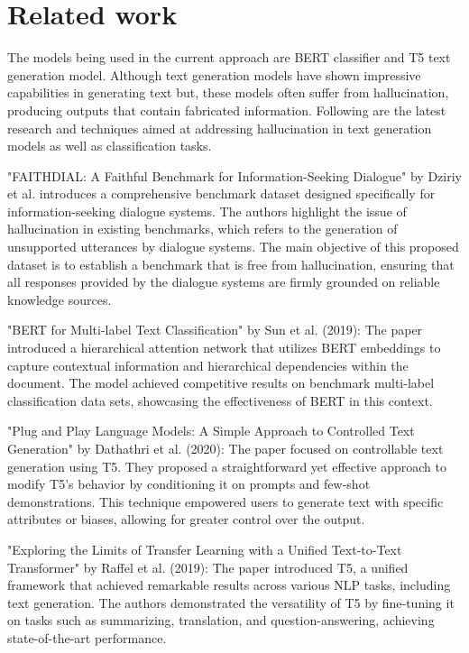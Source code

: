\documentclass[11pt]{article}
\begin{document}
\section{Related work}
The models being used in the current approach are BERT classifier and T5 text generation model. Although text generation models have shown impressive capabilities in generating text but, these models often suffer from hallucination, producing outputs that contain fabricated information. Following are the latest research and techniques aimed at addressing hallucination in text generation models as well as classification tasks. \par
"FAITHDIAL: A Faithful Benchmark for Information-Seeking Dialogue" by Dziriy et al. introduces a comprehensive benchmark dataset designed specifically for information-seeking dialogue systems. The authors highlight the issue of hallucination in existing benchmarks, which refers to the generation of unsupported utterances by dialogue systems. The main objective of this proposed dataset is to establish a benchmark that is free from hallucination, ensuring that all responses provided by the dialogue systems are firmly grounded on reliable knowledge sources.\par
"BERT for Multi-label Text Classification" by Sun et al. (2019):
 The paper introduced a hierarchical attention network that utilizes BERT embeddings to capture contextual information and hierarchical dependencies within the document. The model achieved competitive results on benchmark multi-label classification data sets, showcasing the effectiveness of BERT in this context.\par
"Plug and Play Language Models: A Simple Approach to Controlled Text Generation" by Dathathri et al. (2020):
The paper focused on controllable text generation using T5. They proposed a straightforward yet effective approach to modify T5's behavior by conditioning it on prompts and few-shot demonstrations. This technique empowered users to generate text with specific attributes or biases, allowing for greater control over the output.\par
"Exploring the Limits of Transfer Learning with a Unified Text-to-Text Transformer" by Raffel et al. (2019):
The paper introduced T5, a unified framework that achieved remarkable results across various NLP tasks, including text generation. The authors demonstrated the versatility of T5 by fine-tuning it on tasks such as summarizing, translation, and question-answering, achieving state-of-the-art performance.\par
\end{document}
